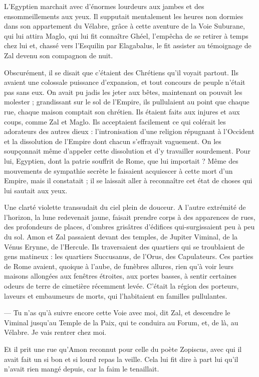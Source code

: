 \documentclass[a4paper, 11pt, oneside, polutonikogreek, french]{article}
\begin{document}
L'Egyptien marchait avec d'énormes lourdeurs aux jambes et des ensommeillements aux yeux. Il supputait mentalement les heures non dormies dans son appartement du Vélabre, grâce à cette aventure de la Voie Suburane, qui lui attira Maglo, qui lui fit connaître Ghéel, l'empêcha de se retirer à temps chez lui et, chassé vers l'Esquilin par Elagabalus, le fit assister au témoignage de Zal devenu son compagnon de nuit.

Obscurément, il se disait que c'étaient des Chrétiens qu'il voyait partout. Ils avaient une colossale puissance d'expansion, et tout concours de peuple n'était pas sans eux. On avait pu jadis les jeter aux bêtes, maintenant on pouvait les molester ; grandissant sur le sol de l'Empire, ils pullulaient au point que chaque rue, chaque maison comptait son chrétien. Ils étaient faits aux injures et aux coups, comme Zal et Maglo. Ils acceptaient facilement ce qui colérait les adorateurs des autres dieux : l'intronisation d'une religion répugnant à l'Occident et la dissolution de l'Empire dont chacun s'effrayait vaguement. On les soupçonnait même d'appeler cette dissolution et d'y travailler sourdement. Pour lui, Egyptien, dont la patrie souffrit de Rome, que lui importait ? Même des mouvements de sympathie secrète le faisaient acquiescer à cette mort d'un Empire, mais il constatait ; il se laissait aller à reconnaître cet état de choses qui lui sautait aux yeux.

Une clarté violette transsudait du ciel plein de douceur. A l'autre extrémité de l'horizon, la lune redevenait jaune, faisait prendre corps à des apparences de rues, des profondeurs de places, d'ombres grisâtres d'édifices qui-surgissaient peu à peu du sol. Amon et Zal passaient devant des temples, de Jupiter Viminal, de la Vénus Erynne, de l'Hercule. Ils traversaient des quartiers qui se troublaient de gens matineux : les quartiers Succusanus, de l'Orus, des Capulateurs. Ces parties de Rome avaient, quoique à l'aube, de funèbres allures, rien qu'à voir leurs maisons allongées aux fenêtres étroites, aux portes basses, à sentir certaines odeurs de terre de cimetière récemment levée. C'était la région des porteurs, laveurs et embaumeurs de morts, qui l'habitaient en familles pullulantes.

--- Tu n'as qu'à suivre encore cette Voie avec moi, dit Zal, et descendre le Viminal jusqu'au Temple de la Paix, qui te conduira au Forum, et, de là, au Vélabre. Je vais rentrer chez moi.

Et il prit une rue qu'Amon reconnut pour celle du poète Zopiscus, avec qui il avait fait un si bon et si lourd repas la veille. Cela lui fit dire à part lui qu'il n'avait rien mangé depuis, car la faim le tenaillait.
\end{document}
